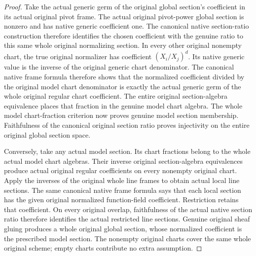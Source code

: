 \begin{proof}
Take the actual generic germ of the original global section's coefficient
in its actual original pivot frame. The actual original pivot-power global
section is nonzero and has native generic coefficient one. The canonical
native section-ratio construction therefore identifies the chosen coefficient
with the genuine ratio to this same whole original normalizing section.
In every other original nonempty chart, the true original normalizer has
coefficient $(X_i/X_j)^d$. Its native generic value is the inverse of the
original generic chart denominator. The canonical native frame formula
therefore shows that the normalized coefficient divided by the original
model chart denominator is exactly the actual generic germ of the whole
original regular chart coefficient. The entire original section-algebra
equivalence places that fraction in the genuine model chart algebra.
The whole model chart-fraction criterion now proves genuine model section
membership. Faithfulness of the canonical original section ratio proves
injectivity on the entire original global section space.

Conversely, take any actual model section. Its chart fractions belong to the
whole actual model chart algebras. Their inverse original section-algebra
equivalences produce actual original regular coefficients on every nonempty
original chart. Apply the inverses of the original whole line frames to
obtain actual local line sections. The same canonical native frame formula
says that each local section has the given original normalized function-field
coefficient. Restriction retains that coefficient. On every original overlap,
faithfulness of the actual native section ratio therefore identifies the
actual restricted line sections. Genuine original sheaf gluing produces a
whole original global section, whose normalized coefficient is the prescribed
model section. The nonempty original charts cover the same whole original
scheme; empty charts contribute no extra assumption.
\end{proof}
